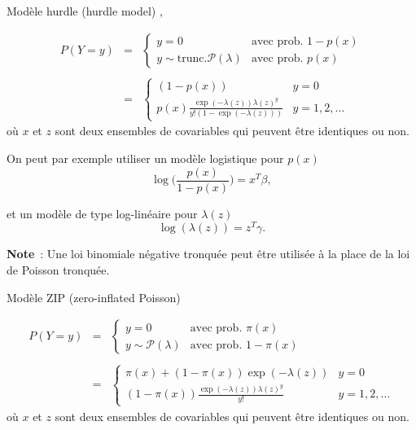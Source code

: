 \documentclass{BeamerTemplate}
\begin{document}
\begin{refsection}
\begin{frame}{Modèle hurdle (hurdle model)}
, 

\begin{eqnarray*}
P(Y=y) & = & \left\{ \begin{array}{ll}
y=0 & \mbox{avec prob. } 1-p(x)\\
y \sim \mbox{trunc.} {\mathcal P}(\lambda) & \mbox{avec prob. } p(x)
\end{array} \right.\\
& & \\
& = &  \left\{
\begin{array}{ll}
(1-p(x))  & y=0\\
p(x) \frac{\exp(-\lambda(z)) \lambda(z)^y}{y! (1-\exp(-\lambda(z)))} & y=1,2,\ldots
\end{array} \right.
\end{eqnarray*}
où $x$ et $z$ sont deux ensembles de covariables qui peuvent être identiques ou non.
\end{frame}

\begin{frame}{}
On peut par exemple utiliser un modèle logistique pour $p(x)$
$$ \log \Big(\frac{p(x)}{1-p(x)} \Big) = x^T
\beta,$$

et un modèle de type log-linéaire pour $\lambda(z)$
$$\log(\lambda(z)) = z^T \gamma.$$

\bigskip
\textbf{Note}~: Une loi binomiale négative tronquée peut être utilisée à la place de la loi de Poisson tronquée. 

\end{frame}

\begin{frame}{Modèle ZIP (zero-inflated Poisson)}



\begin{eqnarray*}
P(Y=y)  & = & \left\{ \begin{array}{ll}
y=0 & \mbox{avec prob. } \pi(x)\\
y \sim {\mathcal P}(\lambda) & \mbox{avec prob. } 1-\pi(x)
\end{array} \right. \\
& & \\
& = &  \left\{
\begin{array}{ll}
\pi(x) + (1-\pi(x)) \exp(-\lambda(z)) & y=0\\
(1-\pi(x)) \frac{\exp(-\lambda(z)) \lambda(z)^{y}}{y!} & y=1,2,\ldots
\end{array} \right.
\end{eqnarray*}
où $x$ et $z$ sont deux ensembles de covariables qui peuvent être identiques ou non.
\end{frame}


\end{refsection}
\end{document}
